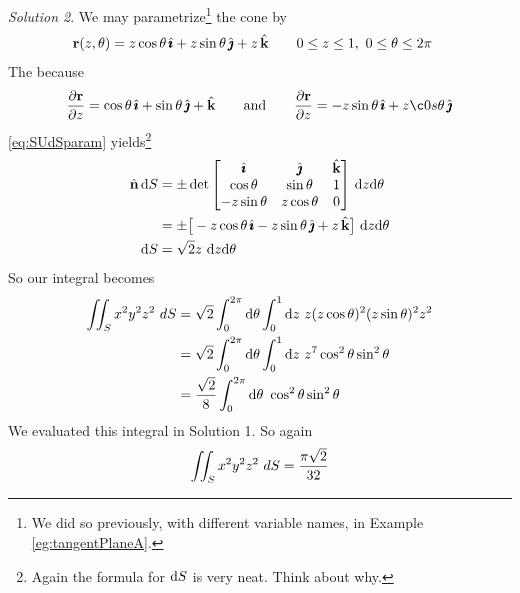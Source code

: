 \begin{eg}
\medskip
\noindent\textit{Solution 2}.
We may parametrize\footnote{We did so previously, with different variable names, in Example \ref{eg:tangentPlaneA}.} the cone by
\begin{align*}
\mathbf{r}(z,\theta) &= z\cos\theta\,\hat{\pmb{\imath}} +  z\sin\theta\,\hat{\pmb{\jmath}} + z\,\hat{\mathbf{k}} \qquad
0\le z\le 1,\ 0\le\theta\le 2\pi
\end{align*}
The because
\begin{align*}
\frac{\partial\vr}{\partial z}
   =  \cos\theta\,\hi +  \sin\theta\,\hj + \hk \qquad\text{and}\qquad
\frac{\partial\vr}{\partial z}
   =  -z\sin\theta\,\hi +  z\c0s\theta\,\hj 
\end{align*}
\eqref{eq:SUdSparam} yields\footnote{Again the formula for $\mathrm{d}S$ is
   very neat. Think about why.}
\begin{align*}
\hn\,\dee{S}
&=\pm\det\left[\begin{matrix}
                   \hi & \hj & \hk \\
                   \cos\theta & \sin\theta & 1 \\
                   -z\sin\theta & z\cos\theta & 0
                \end{matrix}\right]\,\dee{z}\dee{\theta} \\
&=\pm\big[-z\cos\theta\,\hi - z\sin\theta\,\hj + z\,\hk\big]\ 
          \dee{z}\dee{\theta} \\
\dee{S}&= \sqrt{2} z\ \dee{z}\dee{\theta}
\end{align*}
So our integral becomes
\begin{align*}
\dblInt_S x^2y^2z^2\ dS 
&= \sqrt{2}\int_0^{2\pi}\dee{\theta} \int_0^1\dee{z}\ 
           z (z\cos\theta)^2 (z\sin\theta)^2 z^2 \\
&= \sqrt{2}\int_0^{2\pi}\dee{\theta} \int_0^1\dee{z}\ z^7
           \cos^2\theta \sin^2\theta \\
&=\frac{\sqrt{2}}{8} \int_0^{2\pi}\dee{\theta}\ 
          \cos^2\theta \sin^2\theta 
\end{align*} 
We evaluated this integral in Solution 1. So again
\begin{equation*}
\dblInt_S x^2y^2z^2\ dS   =\frac{\pi\sqrt{2}}{32} 
\end{equation*}
\end{eg}

